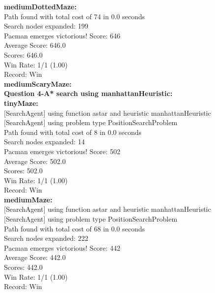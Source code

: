 \documentclass[11pt]{article}
\begin{document}
\noindent
\textbf{mediumDottedMaze:}\\
Path found with total cost of 74 in 0.0 seconds\\
Search nodes expanded: 199\\
Pacman emerges victorious! Score: 646\\
Average Score: 646.0\\
Scores:        646.0\\
Win Rate:      1/1 (1.00)\\
Record:        Win\\

\noindent
\textbf{mediumScaryMaze:}\\








\newpage
\noindent
\textbf{Question 4-A* search using manhattanHeuristic:}\\
\textbf{tinyMaze:}\\
$[$SearchAgent$]$ using function astar and heuristic manhattanHeuristic\\
$[$SearchAgent$]$ using problem type PositionSearchProblem\\
Path found with total cost of 8 in 0.0 seconds\\
Search nodes expanded: 14\\
Pacman emerges victorious! Score: 502\\
Average Score: 502.0\\
Scores:        502.0\\
Win Rate:      1/1 (1.00)\\
Record:        Win\\

\noindent
\textbf{mediumMaze:}\\
$[$SearchAgent$]$ using function astar and heuristic manhattanHeuristic\\
$[$SearchAgent$]$ using problem type PositionSearchProblem\\
Path found with total cost of 68 in 0.0 seconds\\
Search nodes expanded: 222\\
Pacman emerges victorious! Score: 442\\
Average Score: 442.0\\
Scores:        442.0\\
Win Rate:      1/1 (1.00)\\
Record:        Win\\
\end{document}
